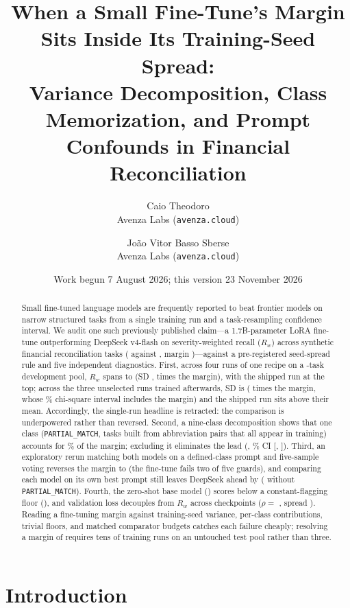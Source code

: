 \documentclass[11pt]{article}
\title{When a Small Fine-Tune's Margin Sits Inside Its Training-Seed Spread:\\
Variance Decomposition, Class Memorization, and Prompt Confounds in Financial Reconciliation}
\author{Caio Theodoro\\ \small Avenza Labs (\texttt{avenza.cloud}) \and Jo\~{a}o Vitor Basso Sberse\\ \small Avenza Labs (\texttt{avenza.cloud})}
\date{Work begun 7 August 2026; this version 23 November 2026}
\begin{document}
\maketitle

\begin{abstract}
Small fine-tuned language models are frequently reported to beat frontier models on narrow structured tasks from a single training run and a task-resampling confidence interval. We audit one such previously published claim---a 1.7B-parameter LoRA fine-tune outperforming DeepSeek v4-flash on severity-weighted recall ($R_w$) across \nBench{} synthetic financial reconciliation tasks (\rwChamp{} against \rwDS{}, margin \margin{})---against a pre-registered seed-spread rule and five independent diagnostics. First, across four runs of one recipe on a \nPoolTasks{}-task development pool, $R_w$ spans \rwSeedLow{} to \rwShipped{} (SD \rwSD{}, \sdOverMargin{} times the margin), with the shipped run at the top; across the three unselected runs trained afterwards, SD is \rwFreshSD{} (\freshSDoverMargin{} times the margin, whose \ciPct{}\% chi-square interval includes the margin) and the shipped run sits \shipGapFresh{} above their mean. Accordingly, the single-run headline is retracted: the comparison is underpowered rather than reversed. Second, a nine-class decomposition shows that one class (\texttt{PARTIAL\_MATCH}, \partialN{} tasks built from \pmPairs{} abbreviation pairs that all appear in training) accounts for \partialShare{}\% of the margin; excluding it eliminates the lead (\noPmPub{}, \ciPct{}\% CI [\noPmPubLo{}, \noPmPubHi{}]). Third, an exploratory rerun matching both models on a defined-class prompt and five-sample voting reverses the margin to \matMargin{} (the fine-tune fails two of five guards), and comparing each model on its own best prompt still leaves DeepSeek ahead by \bestPromptAbs{} (\noPmBest{} without \texttt{PARTIAL\_MATCH}). Fourth, the zero-shot base model (\rwBase{}) scores below a constant-flagging floor (\floorRw{}), and validation loss decouples from $R_w$ across \nCkpt{} checkpoints ($\rho = $ \ckptRho{}, spread \ckptSpread{}). Reading a fine-tuning margin against training-seed variance, per-class contributions, trivial floors, and matched comparator budgets catches each failure cheaply; resolving a margin of \margin{} requires tens of training runs on an untouched test pool rather than three.
\end{abstract}

\section{Introduction}
\label{sec:intro}
\end{document}
